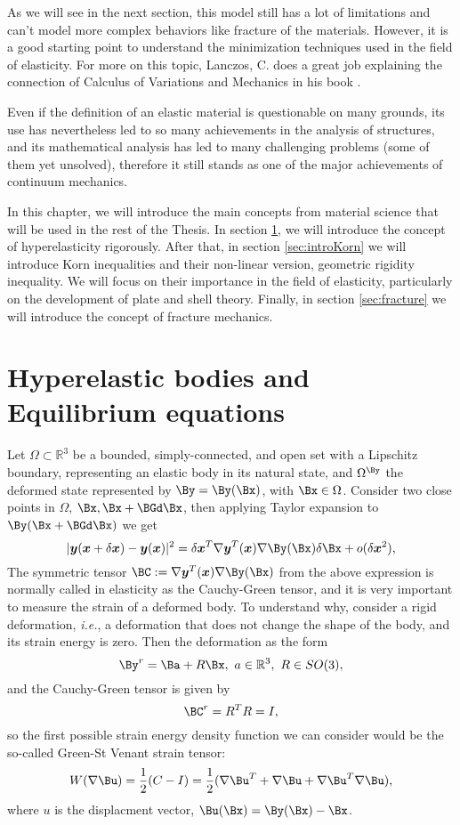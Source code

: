 As we will see in the next section, this model still has a lot of limitations and can't model more complex behaviors like fracture of the materials. However, it is a good starting point to understand the minimization techniques used in the field of elasticity.  For more on this topic, Lanczos, C. does a great job explaining the connection of Calculus of Variations and Mechanics in his book \cite{MSVariational}.

Even if the definition of an elastic material is questionable on many grounds, its use has nevertheless led to so many achievements in the analysis of structures, and its mathematical analysis has led
to many challenging problems (some of them yet unsolved), therefore it still stands as one of the major achievements of continuum mechanics. 


In this chapter, we will introduce the main concepts from material science that will be used in the rest of the Thesis. In section \ref{sec:hyper}, we will introduce the concept of hyperelasticity rigorously. After that, in section \ref{sec:introKorn} we will introduce Korn inequalities and their non-linear version, geometric rigidity inequality. We will focus on their importance in the field of elasticity, particularly on the development of plate and shell theory. Finally, in section \ref{sec:fracture} we will introduce the concept of fracture mechanics.

\section{Hyperelastic bodies and Equilibrium equations}
\label{sec:hyper}

Let $\Omega\subset\mathbb{R}^3$ be a bounded, simply-connected, and open set with a Lipschitz boundary, representing an elastic body in its natural state, and $\Omega^\By$ the deformed state represented by $\By=\By (\Bx)$, with $\Bx\in\Omega$. Consider two close points in $\Omega$, $\Bx, \Bx + \BGd \Bx $,  then applying Taylor expansion to $\By (\Bx + \BGd\Bx)$ we get
\begin{equation*}
|\bm y(\bm x + \delta \bm x)-\bm y(\bm x)|^2 = \delta \bm x^T \nabla \bm y^T(\bm x)\nabla \By(\Bx)\delta\Bx + o(\delta \bm x^2),
\end{equation*}
The symmetric tensor $ \BC:= \nabla \bm y^T(\bm x)\nabla \By(\Bx)$ from the above expression is normally called in elasticity as the Cauchy-Green tensor, and it is very important to measure the strain of a deformed body. To understand why, consider a rigid deformation, \textit{i.e.}, a deformation that does not change the shape of the body, and its strain energy is zero. Then the deformation as the form
$$\By^r = \Ba+R\Bx,\ a\in\R^3,\ R\in SO(3),$$
and the Cauchy-Green tensor is given by
$$\BC^r = R^TR = I,$$
so the first possible  strain energy density function we can consider would be the so-called Green-St Venant strain tensor:
\begin{equation}
    W(\nabla \Bu) = \frac{1}{2}(C-I)=\frac{1}{2}(\nabla \Bu^T+\nabla \Bu + \nabla \Bu^T\nabla \Bu),
\end{equation}
where $u$ is the displacment vector, $\Bu(\Bx) = \By(\Bx) - \Bx$.

